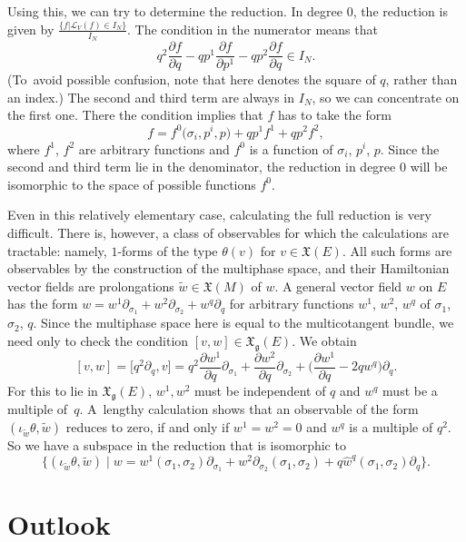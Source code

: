 \documentclass[10pt,a4paper]{amsart}
\numberwithin{equation}{section}
\newcommand{\g}{\mathfrak{g}}
\renewcommand{\L}{\mathscr{L}}
\newcommand{\X}{\mathfrak{X}}
\begin{document}
Using this, we can try to determine the reduction.
In degree $0$, the reduction is given by $\frac{\{f|\L_V(f)\in I_N\}}{I_N}$. The condition in the numerator means that
\[
q^2\frac{\partial f}{\partial q}-qp^1\frac{\partial f}{\partial p^1}-qp^2\frac{\partial f}{\partial q} \in I_N.
\] \big(To~avoid possible confusion, note that here  denotes the square of $q$, rather than an index.\big) The second and third term are always in $I_N$, so we can concentrate on the first one. There the condition implies that $f$ has to take the form
\[
	f=f^0\bigl(\sigma_i,p^i,p\bigr)+ qp^1f^1+ qp^2f^2,
\]
where $f^1$, $f^2$ are arbitrary functions and $f^0$ is a function of $\sigma_i$, $p^i$, $p$. Since the second and third term lie in the denominator, the reduction in degree $0$ will be isomorphic to the space of possible functions $f^0$.

Even in this relatively elementary case, calculating the full reduction is very difficult. There is, however, a class of observables for which the calculations are tractable: namely, $1$-forms of the type $\theta(v)$ for $v\in \mathfrak X(E)$. All such forms are observables by the construction of the multiphase space, and their Hamiltonian vector fields are prolongations $\tilde w\in \mathfrak X(M)$ of $w$. A general vector field $w$ on $E$ has the form $w=w^1\partial_{\sigma_1}+w^2\partial_{\sigma_2}+w^q\partial_{q} $
for arbitrary functions $w^1$, $w^2$, $w^q$ of $\sigma_1$, $\sigma_2$, $q$.
Since the multiphase space here is equal to the multicotangent bundle, we need only to check the condition $[v,w ]\in \X_\g(E)$. We obtain
\[
	[v,w]=\bigl[q^2\partial_q,v\bigr]=q^2\frac{\partial w^1}{\partial q}\partial_{\sigma_1}+\frac{\partial w^2}{\partial q}\partial_{\sigma_2}+\biggl(\frac{\partial w^1}{\partial q}-2qw^q\biggr)\partial_{q} .
\]
For this to lie in $\X_\g(E)$, $w^1,w^2$ must be independent of $q$ and $w^q$ must be a multiple of~$q$. A~lengthy calculation shows that an observable of the form $(\iota_{\tilde w}\theta, \tilde w)$ reduces to zero, if and only if $w^1=w^2=0$ and $w^q$ is a multiple of $q^2$. So we have a subspace in the reduction that is isomorphic to
\[
\bigl\{(\iota_{\tilde w}\theta, \tilde w)\mid w=w^1(\sigma_1,\sigma_2)\partial_{\sigma_1}+w^2\partial_{\sigma_2}(\sigma_1,\sigma_2)+q\hat w^q(\sigma_1,\sigma_2)\partial_{q}
\bigr\}.
\]

\section{Outlook}\label{Sec:Outlook}
\end{document}
